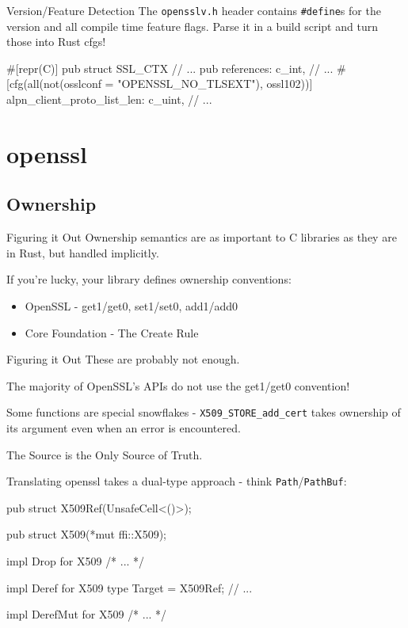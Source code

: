 \documentclass{beamer}
\begin{document}
\begin{frame}[fragile]{Version/Feature Detection}
    The \verb!opensslv.h! header contains \verb!#define!s for the version and
    all compile time feature flags. Parse it in a build script and turn those
    into Rust cfgs!

    \begin{rustcode}
#[repr(C)]
pub struct SSL_CTX {
    // ...
    pub references: c_int,
    // ...
    #[cfg(all(not(osslconf = "OPENSSL_NO_TLSEXT"),
              ossl102))]
    alpn_client_proto_list_len: c_uint,
    // ...
}
    \end{rustcode}
\end{frame}

\section{openssl}

\subsection{Ownership}

\begin{frame}{Figuring it Out}
    Ownership semantics are as important to C libraries as they are in Rust,
    but handled implicitly.

    If you're lucky, your library defines ownership conventions:
    \begin{itemize}
        \item OpenSSL - get1/get0, set1/set0, add1/add0
        \item Core Foundation - The Create Rule
    \end{itemize}
\end{frame}

\begin{frame}[fragile]{Figuring it Out}
    These are probably not enough.

    The majority of OpenSSL's APIs do not use the get1/get0 convention!

    Some functions are special snowflakes - \verb!X509_STORE_add_cert! takes
    ownership of its argument even when an error is encountered. \pause

    \begin{center}
        \LARGE The Source is the Only Source of Truth.
    \end{center}
\end{frame}

\begin{frame}[fragile]{Translating}
    openssl takes a dual-type approach - think \verb!Path!/\verb!PathBuf!:

    \begin{rustcode}
pub struct X509Ref(UnsafeCell<()>);

pub struct X509(*mut ffi::X509);

impl Drop for X509 { /* ... */ }

impl Deref for X509 {
    type Target = X509Ref;
    // ...
}

impl DerefMut for X509 { /* ... */ }
    \end{rustcode}
\end{frame}
\end{document}
